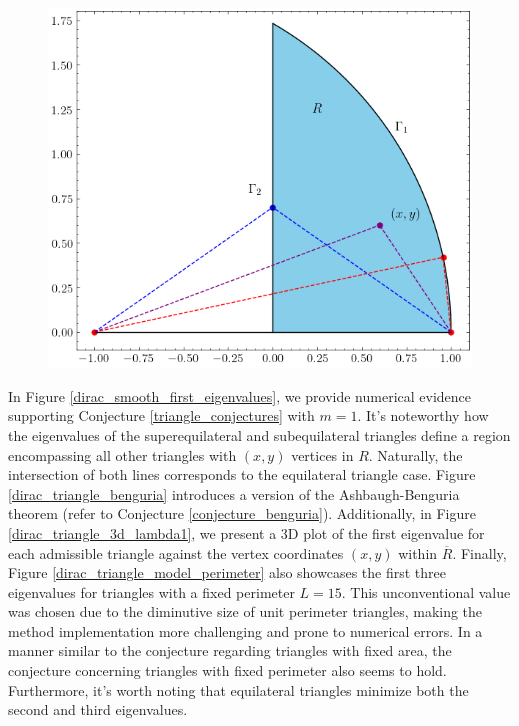 \begin{figure}[!htb]
    \centering
    \includegraphics[width=0.5\linewidth]{Images/Dirac/model_triangle.png}
    \label{dirac_triangle_model}
\end{figure}

In Figure \ref{dirac_smooth_first_eigenvalues}, we provide numerical evidence supporting Conjecture \ref{triangle_conjectures} with \(m=1\). It's noteworthy how the eigenvalues of the superequilateral and subequilateral triangles define a region encompassing all other triangles with \((x, y)\) vertices in \(R\). Naturally, the intersection of both lines corresponds to the equilateral triangle case. Figure \ref{dirac_triangle_benguria} introduces a version of the Ashbaugh-Benguria theorem (refer to Conjecture \ref{conjecture_benguria}). Additionally, in Figure \ref{dirac_triangle_3d_lambda1}, we present a 3D plot of the first eigenvalue for each admissible triangle against the vertex coordinates \((x,y)\) within \(\overline{R}\). Finally, Figure \ref{dirac_triangle_model_perimeter} also showcases the first three eigenvalues for triangles with a fixed perimeter \(L = 15\). This unconventional value was chosen due to the diminutive size of unit perimeter triangles, making the method implementation more challenging and prone to numerical errors. In a manner similar to the conjecture regarding triangles with fixed area, the conjecture concerning triangles with fixed perimeter also seems to hold. Furthermore, it's worth noting that equilateral triangles minimize both the second and third eigenvalues.

